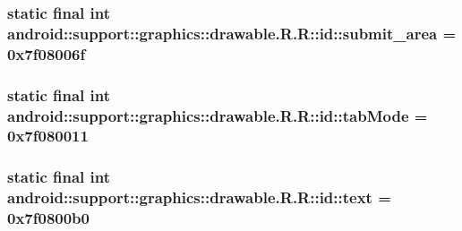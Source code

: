 \hypertarget{classandroid_1_1support_1_1graphics_1_1drawable_1_1_r_1_1id_b4d7e3194ce58de838d3f2b4691b34ee}{
\subsubsection[{submit\_\-area}]{\setlength{\rightskip}{0pt plus 5cm}static final int android::support::graphics::drawable.R.R::id::submit\_\-area = 0x7f08006f}}
\label{classandroid_1_1support_1_1graphics_1_1drawable_1_1_r_1_1id_b4d7e3194ce58de838d3f2b4691b34ee}


\hypertarget{classandroid_1_1support_1_1graphics_1_1drawable_1_1_r_1_1id_00ffe15ba4fd7e756dc720dc00ca805f}{
\subsubsection[{tabMode}]{\setlength{\rightskip}{0pt plus 5cm}static final int android::support::graphics::drawable.R.R::id::tabMode = 0x7f080011}}
\label{classandroid_1_1support_1_1graphics_1_1drawable_1_1_r_1_1id_00ffe15ba4fd7e756dc720dc00ca805f}


\hypertarget{classandroid_1_1support_1_1graphics_1_1drawable_1_1_r_1_1id_33605f02e34adc85c97f9f0ab5da1e5e}{
\subsubsection[{text}]{\setlength{\rightskip}{0pt plus 5cm}static final int android::support::graphics::drawable.R.R::id::text = 0x7f0800b0}}
\label{classandroid_1_1support_1_1graphics_1_1drawable_1_1_r_1_1id_33605f02e34adc85c97f9f0ab5da1e5e}


